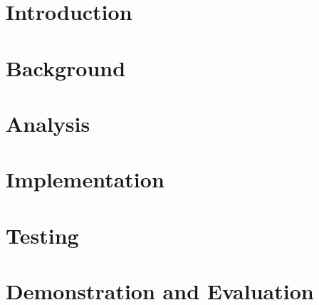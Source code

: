 




\thispagestyle{empty}
\newpage

\thispagestyle{plain}


\newpage

\setcounter{secnumdepth}{2} %
\setcounter{tocdepth}{2} %
\tableofcontents*


\chapter{Introduction}


\chapter{Background}
\label{bg}






% 
\newpage

\chapter{Analysis}
\label{an}

\newpage

\chapter{Implementation}
\label{im}







\newpage

\chapter{Testing}
\label{te}


\chapter{Demonstration and Evaluation}
\label{de}


\newpage

